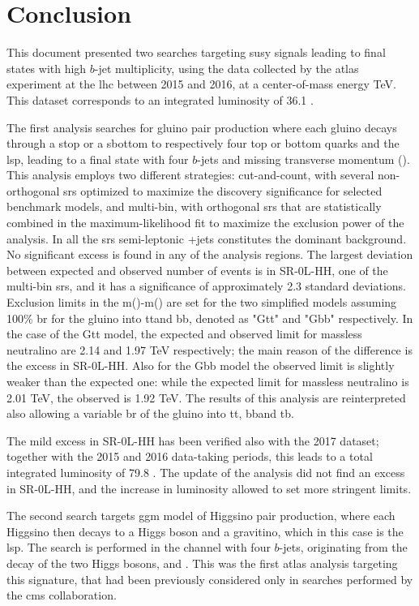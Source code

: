 \chapter*{Conclusion}

This document presented two searches targeting \gls{susy} signals leading to final states with 
high $b$-jet multiplicity, using the data collected by the \gls{atlas} experiment at the \gls{lhc} 
between 2015 and 2016, at a center-of-mass energy  \cmtre TeV. 
This dataset corresponds to an integrated luminosity of 36.1 \ifb.

The first analysis searches for gluino pair production where each gluino decays through a stop or a sbottom 
to respectively four top or bottom quarks and the \gls{lsp}, leading to a final state with four $b$-jets and 
missing transverse momentum (\met). 
This analysis employs two different strategies: cut-and-count, with several non-orthogonal \glspl{sr} optimized to 
maximize the discovery significance for selected benchmark models, and multi-bin, with orthogonal \glspl{sr} 
that are statistically combined in the maximum-likelihood fit 
to maximize the exclusion power of the analysis. 
In all the \glspl{sr} semi-leptonic \ttbar+jets constitutes the dominant background.
No significant excess is found in any of the analysis regions. 
The largest deviation between expected and observed number of events 
is in SR-0L-HH, one of the multi-bin \glspl{sr}, and it has a significance of approximately 
2.3 standard deviations. 
Exclusion limits in the m(\gluino)-m(\ninoone) are set for the two simplified models assuming 
100\% \gls{br} for the gluino into tt\ninoone and bb\ninoone, denoted as "Gtt" and "Gbb" respectively.
In the case of the Gtt model, the expected and observed limit for massless neutralino 
are 2.14 and 1.97 TeV respectively; the main reason of the difference is the excess in SR-0L-HH.
Also for the Gbb model the observed limit is slightly weaker than the expected one: 
while the expected limit for massless neutralino is 2.01 TeV, the observed is 1.92 TeV.
The results of this analysis are reinterpreted also allowing a variable \gls{br} of the gluino 
into tt\ninoone, bb\ninoone and tb\chinoonepm. 

The mild excess in SR-0L-HH has been verified also with the 2017 dataset; together 
with the 2015 and 2016 data-taking periods, this leads to a total integrated luminosity 
of 79.8 \ifb. 
The update of the analysis did not find an excess in SR-0L-HH, and the increase in luminosity 
allowed to set more stringent limits.




The second search targets \gls{ggm} model of Higgsino pair production, where each Higgsino then decays to a Higgs boson and 
a gravitino, which in this case is the \gls{lsp}. The search is performed in the channel with four $b$-jets, originating from 
the decay of the two Higgs bosons, and \met. 
This was the first \gls{atlas} analysis targeting this signature, that had been 
previously considered only in searches performed by the \gls{cms} collaboration.






